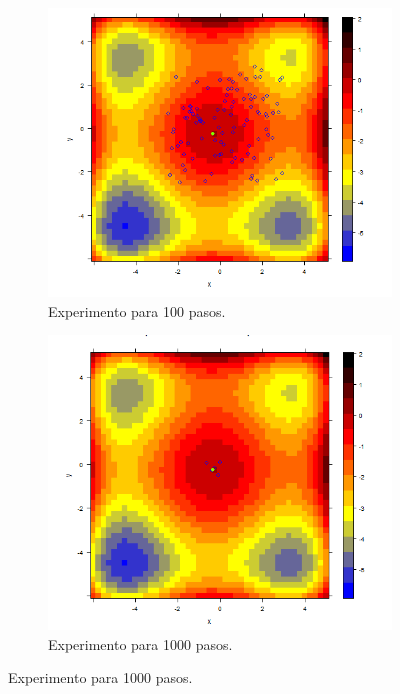 \documentclass{article}
\begin{document}
\begin{figure}
	\centering
	\begin{subfigure}[b]{0.45\linewidth}
		\includegraphics[width=\linewidth]{t7100.png}
		\caption{Experimento para 100 pasos.}
		\label{1}
	\end{subfigure}
		\begin{subfigure}[b]{0.45\linewidth}
		\includegraphics[width=\linewidth]{t71000.png}
		\caption{Experimento para 1000 pasos.}
		\label{2}
	\end{subfigure}

\end{figure}
\end{document}
